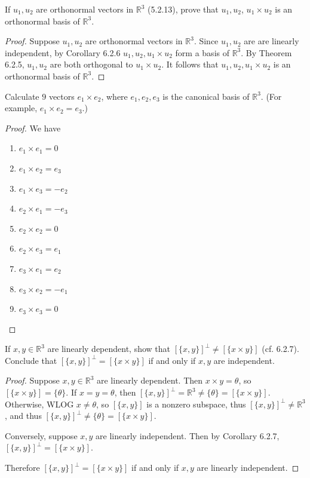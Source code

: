 \begin{tcolorbox}[title=Problem 2, breakable]
    If $u_1, u_2$ are orthonormal vectors in $\mathbb{R}^3$
    (5.2.13), prove that $u_1, u_2$, $u_1 \times u_2$ is an orthonormal 
    basis of $\mathbb{R}^3$.
\end{tcolorbox}

\begin{proof}
    Suppose $u_1, u_2$ are orthonormal vectors in $\mathbb{R}^3$.
    Since $u_1, u_2$ are are linearly independent,
        by Corollary 6.2.6 $u_1, u_2, u_1 \times u_2$ form a basis of $\mathbb{R}^3$.
    By Theorem 6.2.5, $u_1, u_2$ are both orthogonal to $u_1 \times u_2$.
    It follows that $u_1, u_2, u_1 \times u_2$ is an orthonormal basis of $\mathbb{R}^3$.
\end{proof}


\begin{tcolorbox}[title=Problem 3, breakable]
    Calculate $9$ vectors $e_1 \times e_2$, where $e_1, e_2, e_3$
    is the canonical basis of $\mathbb{R}^3$. 
    (For example, $e_1 \times e_2 = e_3$.)
\end{tcolorbox}

\begin{proof}
    We have
\begin{enumerate}
    \item $e_1 \times e_1 = 0$
    \item $e_1 \times e_2 = e_3$
    \item $e_1 \times e_3 = -e_2$
    \item $e_2 \times e_1 = -e_3$
    \item $e_2 \times e_2 = 0$
    \item $e_2 \times e_3 = e_1$
    \item $e_3 \times e_1 = e_2$
    \item $e_3 \times e_2 = -e_1$
    \item $e_3 \times e_3 = 0$
\end{enumerate}
\end{proof}

\begin{tcolorbox}[title=Problem 4, breakable]
    If $x, y \in \mathbb{R}^3$ are linearly dependent,
    show that $[\{x, y\}]^\perp \ne [\{x \times y\}]$ (cf. 6.2.7).
    Conclude that $[\{x, y\}]^\perp = [\{x \times y\}]$ if and only if 
    $x, y$ are independent.
\end{tcolorbox}

\begin{proof}
    Suppose $x, y \in \mathbb{R}^3$ are linearly dependent.
    Then $x \times y = \theta$, so $[\{x \times y\}] = \{\theta\}$.
    If $x = y = \theta$, then $[\{x, y\}]^\perp = \mathbb{R}^3 \ne \{\theta\} = [\{x \times y\}]$.
    Otherwise, WLOG $x \ne \theta$, so $[\{x, y\}]$ is a nonzero subspace,
    thus $[\{x, y\}]^\perp \ne \mathbb{R}^3$, and thus
    $[\{x, y\}]^\perp \ne \{\theta\} = [\{x \times y\}]$.

    Conversely, suppose $x, y$ are linearly independent.
    Then by Corollary 6.2.7, $[\{x, y\}]^\perp = [\{x \times y\}]$.

    Therefore $[\{x, y\}]^\perp = [\{x \times y\}]$ if and only if $x, y$ are linearly independent.
\end{proof}

